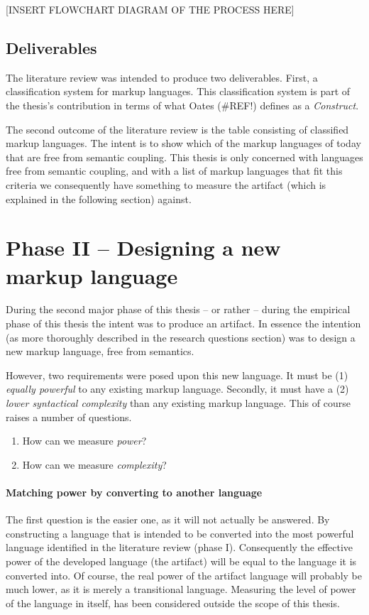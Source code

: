 \documentclass{scrreprt}
\begin{document}
[INSERT FLOWCHART DIAGRAM OF THE PROCESS HERE]


\subsection{Deliverables}
The literature review was intended to produce two deliverables. First, a classification system for markup languages. This classification system is part of the thesis's contribution in terms of what Oates (\#REF!) defines as a \emph{Construct}.

The second outcome of the literature review is the table consisting of classified markup languages. The intent is to show which of the markup languages of today that are free from semantic coupling. This thesis is only concerned with languages free from semantic coupling, and with a list of markup languages that fit this criteria we consequently have something to measure the artifact (which is explained in the following section) against.



\section{Phase II -- Designing a new markup language}
During the second major phase of this thesis -- or rather -- during the empirical phase of this thesis the intent was to produce an artifact. In essence the intention (as more thoroughly described in the research questions section) was to design a new markup language, free from semantics.

However, two requirements were posed upon this new language. It must be (1) \emph{equally powerful} to any existing markup language. Secondly, it must have a (2) \emph{lower syntactical complexity} than any existing markup language. This of course raises a number of questions.



\begin{enumerate}
\item How can we measure \emph{power}?
\item How can we measure \emph{complexity}?
\end{enumerate}

\paragraph{Matching power by converting to another language}
The first question is the easier one, as it will not actually be answered. By constructing a language that is intended to be converted into the most powerful language identified in the literature review (phase I). Consequently the effective power of the developed language (the artifact) will be equal to the language it is converted into. Of course, the real power of the artifact language will probably be much lower, as it is merely a transitional language. Measuring the level of power of the language in itself, has been considered outside the scope of this thesis.
\end{document}
